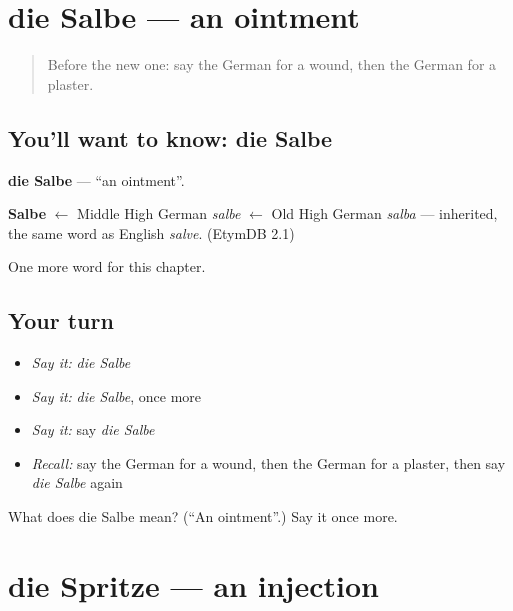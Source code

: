 \section[die Salbe]{die Salbe — an ointment}

\label{lesson:GE-C206-salbe}



\begin{quote}
Before the new one: say the German for a wound, then the German for a plaster.
\end{quote}

\subsection*{You'll want to know: die Salbe}
\textbf{die Salbe} — \textquotedblleft{}an ointment\textquotedblright{}.

\begin{cousinweb}
\textbf{Salbe} $\leftarrow$ Middle High German \emph{salbe} $\leftarrow$ Old High German \emph{salba} — inherited, the same word as English \emph{salve}. (EtymDB 2.1)
\end{cousinweb}

\begin{grammarlens}[title={What you've built}]
One more word for this chapter.
\end{grammarlens}

\subsection*{Your turn}
\begin{itemize}
\raggedright
  \item \emph{Say it:} \emph{die Salbe}
  \item \emph{Say it:} \emph{die Salbe}, once more
  \item \emph{Say it:} say \emph{die Salbe}
  \item \emph{Recall:} say the German for a wound, then the German for a plaster, then say \emph{die Salbe} again
\end{itemize}

\begin{tcolorbox}[breakable,colback=teal!4,colframe=teal!35!black,title={Before you move on}]
What does die Salbe mean? (\textquotedblleft{}An ointment\textquotedblright{}.) Say it once more.
\end{tcolorbox}
\section[die Spritze]{die Spritze — an injection}

